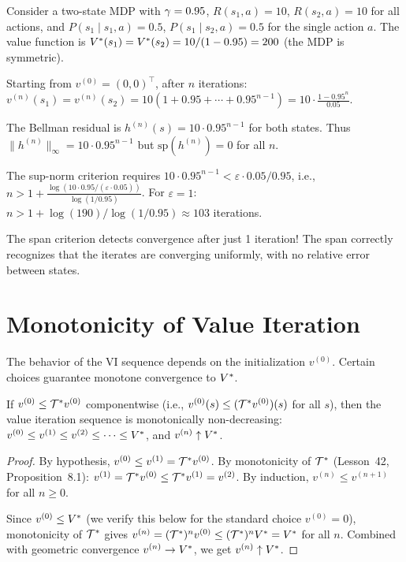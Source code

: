 \documentclass[11pt,a4paper]{article}
\begin{document}
\begin{example}
\label{ex:span-vs-sup}
Consider a two-state MDP with $\gamma = 0.95$, $R(s_1,a) = 10$,
$R(s_2,a) = 10$ for all actions, and $P(s_1 \mid s_1, a) = 0.5$,
$P(s_1 \mid s_2, a) = 0.5$ for the single action $a$. The value
function is $V^*(s_1) = V^*(s_2) = 10/(1-0.95) = 200$ (the
MDP is symmetric).

Starting from $v^{(0)} = (0,0)^\top$, after $n$ iterations:
$v^{(n)}(s_1) = v^{(n)}(s_2) = 10(1 + 0.95 + \cdots +
0.95^{n-1}) = 10 \cdot \frac{1 - 0.95^n}{0.05}$.

The Bellman residual is $h^{(n)}(s) = 10 \cdot 0.95^{n-1}$ for both
states. Thus $\|h^{(n)}\|_\infty = 10 \cdot 0.95^{n-1}$ but
$\mathrm{sp}(h^{(n)}) = 0$ for all $n$.

The sup-norm criterion requires $10 \cdot 0.95^{n-1} <
\varepsilon \cdot 0.05/0.95$, i.e.,
$n > 1 + \frac{\log(10 \cdot 0.95/(\varepsilon \cdot 0.05))}
{\log(1/0.95)}$. For $\varepsilon = 1$:
$n > 1 + \log(190)/\log(1/0.95) \approx 103$ iterations.

The span criterion detects convergence after just 1 iteration!
The span correctly recognizes that the iterates are converging
uniformly, with no relative error between states.
\end{example}


\section{Monotonicity of Value Iteration}
\label{sec:monotonicity}

The behavior of the VI sequence depends on the initialization
$v^{(0)}$. Certain choices guarantee monotone convergence to $V^*$.

\begin{theorem}
\label{thm:monotone-below}
If $v^{(0)} \leq \mathcal{T}^* v^{(0)}$ componentwise (i.e.,
$v^{(0)}(s) \leq (\mathcal{T}^* v^{(0)})(s)$ for all $s$), then
the value iteration sequence is monotonically non-decreasing:
$v^{(0)} \leq v^{(1)} \leq v^{(2)} \leq \cdots \leq V^*$,
and $v^{(n)} \uparrow V^*$.
\end{theorem}

\begin{proof}
By hypothesis, $v^{(0)} \leq v^{(1)} = \mathcal{T}^* v^{(0)}$. By
monotonicity of $\mathcal{T}^*$ (Lesson~42, Proposition~8.1):
$v^{(1)} = \mathcal{T}^* v^{(0)} \leq \mathcal{T}^* v^{(1)} = v^{(2)}$.
By induction, $v^{(n)} \leq v^{(n+1)}$ for all $n \geq 0$.

Since $v^{(0)} \leq V^*$ (we verify this below for the standard
choice $v^{(0)} = 0$), monotonicity of $\mathcal{T}^*$ gives
$v^{(n)} = (\mathcal{T}^*)^n v^{(0)} \leq (\mathcal{T}^*)^n V^* =
V^*$ for all $n$. Combined with geometric convergence
$v^{(n)} \to V^*$, we get $v^{(n)} \uparrow V^*$.
\end{proof}
\end{document}
